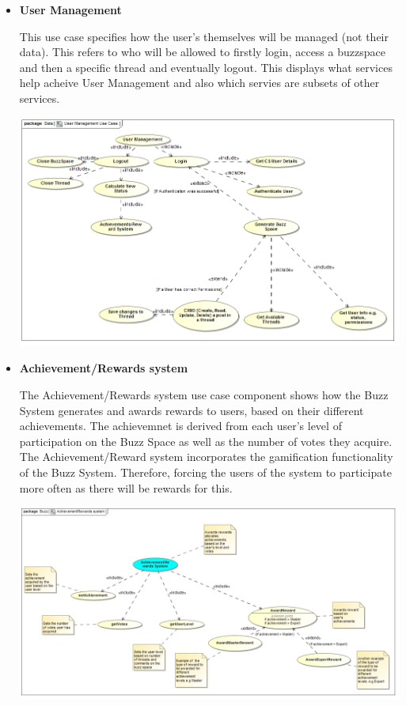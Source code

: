 \documentclass[a4paper,12pt]{report}
\begin{document}
\begin{itemize}
\begin{center}
		\end{center}
\item \textbf{User Management}
		\begin{flushleft}
		This use case specifies how the user's themselves will be managed (not their data). This refers to who will be allowed to firstly login, access a buzzspace and then a specific thread and eventually logout. This displays what services help acheive User Management and also which servies are subsets of other services.
		\end{flushleft}
		\begin{center}
		\includegraphics[width=1\textwidth]{../Kale-ab/UserManagementUseCase.jpg}\\[0.4cm]
		\end{center}
	\item \textbf{Achievement/Rewards system}
		\begin{flushleft}
		The Achievement/Rewards system use case component shows how the Buzz System generates and awards rewards to users, based on their different achievements. The achievemnet is derived from each user's level of participation on the Buzz Space as well as the number of votes they acquire. The Achievement/Reward system incorporates the gamification functionality of the Buzz System. Therefore, forcing the users of the system to participate more often as there will be rewards for this.
		\end{flushleft} 
		\begin{center}
		\includegraphics[width=1\textwidth]{../Goodness/Achievement_Rewards_System_Use_case_Diagram.jpg}\\[0.4cm]
		\end{center}
\end{itemize}
\end{document}
